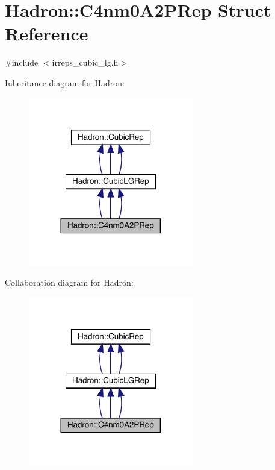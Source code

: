 \hypertarget{structHadron_1_1C4nm0A2PRep}{}\section{Hadron\+:\+:C4nm0\+A2\+P\+Rep Struct Reference}
\label{structHadron_1_1C4nm0A2PRep}


{\ttfamily \#include $<$irreps\+\_\+cubic\+\_\+lg.\+h$>$}



Inheritance diagram for Hadron\+:
\nopagebreak
\begin{figure}[H]
\begin{center}
\leavevmode
\includegraphics[width=204pt]{da/da5/structHadron_1_1C4nm0A2PRep__inherit__graph}
\end{center}
\end{figure}


Collaboration diagram for Hadron\+:
\nopagebreak
\begin{figure}[H]
\begin{center}
\leavevmode
\includegraphics[width=204pt]{d1/d1f/structHadron_1_1C4nm0A2PRep__coll__graph}
\end{center}
\end{figure}
